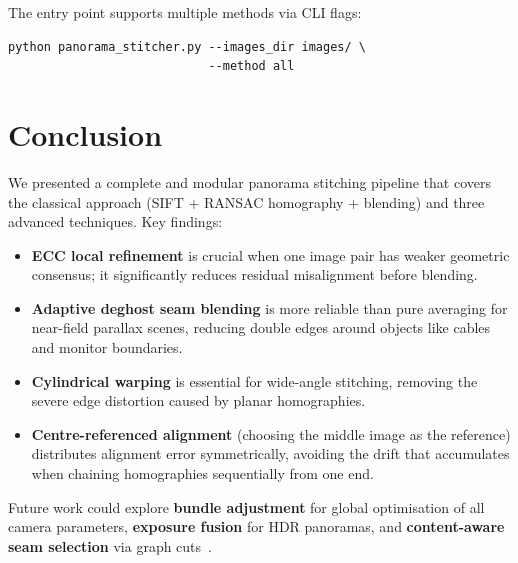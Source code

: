 \documentclass[conference]{IEEEtran}
\begin{document}
The entry point supports multiple methods via CLI flags:
\begin{lstlisting}
python panorama_stitcher.py --images_dir images/ \
                            --method all
\end{lstlisting}


\section{Conclusion}
\label{sec:conclusion}

We presented a complete and modular panorama stitching pipeline that covers
the classical approach (SIFT + RANSAC homography + blending) and three
advanced techniques. Key findings:

\begin{itemize}
  \item \textbf{ECC local refinement} is crucial when one image pair has weaker
        geometric consensus; it significantly reduces residual misalignment
        before blending.
  \item \textbf{Adaptive deghost seam blending} is more reliable than pure
        averaging for near-field parallax scenes, reducing double edges around
        objects like cables and monitor boundaries.
  \item \textbf{Cylindrical warping} is essential for wide-angle stitching,
        removing the severe edge distortion caused by planar homographies.
  \item \textbf{Centre-referenced alignment} (choosing the middle image as
        the reference) distributes alignment error symmetrically, avoiding
        the drift that accumulates when chaining homographies sequentially
        from one end.
\end{itemize}

Future work could explore \textbf{bundle adjustment} for global optimisation
of all camera parameters, \textbf{exposure fusion} for HDR panoramas, and
\textbf{content-aware seam selection} via graph cuts~\cite{kwatra2003}.
\end{document}
